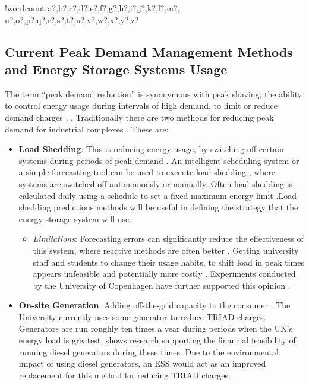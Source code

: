 \documentclass[fontsize=9.5pt]{extarticle}
\numberwithin{figure}{section} %
\providecommand{\tightlist}{%
  \setlength{\itemsep}{0pt}\setlength{\parskip}{0pt}}
\newcounter{words}
\newenvironment{counted}{%
  \setcounter{words}{0}
  \SearchList!{wordcount}{\stepcounter{words}}
    {a?,b?,c?,d?,e?,f?,g?,h?,i?,j?,k?,l?,m?,
    n?,o?,p?,q?,r?,s?,t?,u?,v?,w?,x?,y?,z?}
  \UndoBoundary{'}
  \SearchOrder{p;}}{%
  \StopSearching}
\begin{document}
\begin{counted}
\subsection{Current Peak Demand Management Methods and Energy Storage
Systems
Usage}\label{current-peak-demand-management-methods-and-energy-storage-systems-usage}

The term ``peak demand reduction'' is synonymous with peak shaving; the
ability to control energy usage during intervals of high demand, to
limit or reduce demand charges \cite{schneiderRECPS}, \cite{baldorPS}.
Traditionally there are two methods for reducing peak demand for
industrial complexes \cite{schneiderRECPS}. These are:

\begin{itemize}
\tightlist
\item
  \textbf{Load Shedding}: This is reducing energy usage, by switching
  off certain systems during periods of peak demand \cite{6199851}. An
  intelligent scheduling system or a simple forecasting tool can be used
  to execute load shedding \cite{Reducing37:online}, where systems are
  switched off autonomously or manually. Often load shedding is
  calculated daily using a schedule to set a fixed maximum energy limit
  \cite{6938948}.Load shedding predictions methods will be useful in
  defining the strategy that the energy storage system will use.

  \begin{itemize}
  \tightlist
  \item
    \emph{Limitations}: Forecasting errors can significantly reduce the
    effectiveness of this system, where reactive methods are often
    better \cite{6938948}. Getting university staff and students to
    change their usage habits, to shift load in peak times appears
    unfeasible and potentially more costly \cite{Jbrentmeet}.
    Experiments conducted by the University of Copenhagen have further
    supported this opinion \cite{copenmeet}.
  \end{itemize}
\item
  \textbf{On-site Generation}: Adding off-the-grid capacity to the
  consumer \cite{schneiderRECPS}. The University currently uses some
  generator to reduce TRIAD charges. Generators are run roughly ten
  times a year during periods when the UK's energy load is greatest.
  \cite{shen2016} shows research supporting the financial feasibility of
  running diesel generators during these times. Due to the environmental
  impact of using diesel generators, an ESS would act as an improved
  replacement for this method for reducing TRIAD charges.


\end{itemize}
\end{counted}
\end{document}
